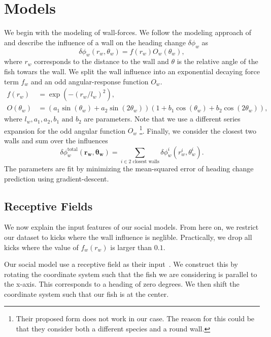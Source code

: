 \documentclass[nobib]{tufte-handout}
\begin{document}
\section{Models}
We begin with the modeling of wall-forces.
We follow the modeling approach of~\autocite{calovi} and describe the influence of a wall on the heading change \(\delta \phi_w\) as
\begin{equation*}
  \delta \phi_w (r_w, \theta_w) = f(r_w)O_w(\theta_w),
\end{equation*}
where $r_w$ corresponds to the distance to the wall and $\theta$ is the relative angle of the fish towars the wall.
We split the wall influence into an exponential decaying force term \(f_w\) and an odd angular-response function \(O_w\).
\begin{align*}
  f(r_w) &= \exp\left( -{(r_w/l_w)}^2 \right), \\
  O(\theta_w) &= \left(a_1 \sin(\theta_w) + a_2 \sin(2  \theta_w)  \right)  \left(1 +  b_1  \cos(\theta_w) + b_2 \cos(2  \theta_w) \right),
\end{align*}
where $l_w, a_1, a_2, b_1 \text{ and } b_2$ are parameters.
Note that we use a different series expansion for the odd angular function \(O_w\)
\footnote{Their proposed form does not work in our case.
  The reason for this could be that they consider both a different species and a round wall.}.
Finally, we consider the closest two walls and sum over the influences
\begin{equation*}
 \delta \phi_w^{\text{total}} \left( \bm{r_w}, \bm{\theta_w} \right) = \sum_{i \in 2 \text{ closest walls}} \delta \phi_w^i (r_w^i, \theta_w^i).
\end{equation*}
The parameters are fit by minimizing the mean-squared error of heading change prediction using gradient-descent.

\subsection{Receptive Fields}
We now explain the input features of our social models.
From here on, we restrict our dataset to kicks where the wall influence is neglible.
Practically, we drop all kicks where the value of \(f_w(r_w)\) is larger than $0.1$.

Our social model use a receptive field as their input~\autocite{discreteModes}.
We construct this by rotating the coordinate system such that the fish we are considering is parallel to the x-axis.
This corresponds to a heading of zero degrees.
We then shift the coordinate system such that our fish is at the center.
\end{document}
